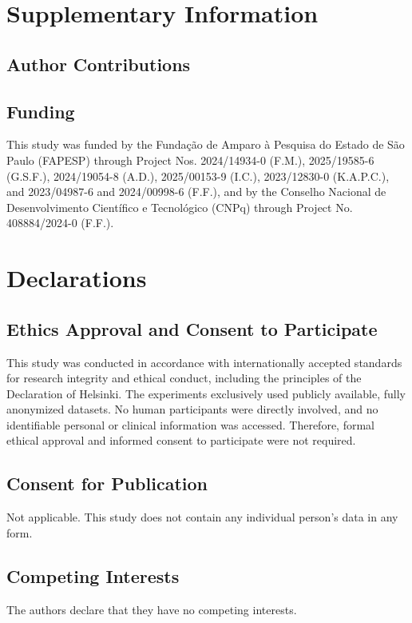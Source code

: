 \documentclass[pdflatex,bst/sn-mathphys-num]{sn-jnl}
\begin{document}
\section*{Supplementary Information}

\subsection*{Author Contributions}


\subsection*{Funding}
This study was funded by the Fundação de Amparo à Pesquisa do Estado de São Paulo (FAPESP) through Project Nos. 2024/14934-0 (F.M.), 2025/19585-6 (G.S.F.), 2024/19054-8 (A.D.), 2025/00153-9 (I.C.), 2023/12830-0 (K.A.P.C.), and 2023/04987-6 and 2024/00998-6 (F.F.), and by the Conselho Nacional de Desenvolvimento Científico e Tecnológico (CNPq) through Project No. 408884/2024-0 (F.F.).

\section*{Declarations}

\subsection*{Ethics Approval and Consent to Participate}
This study was conducted in accordance with internationally accepted standards for research integrity and ethical conduct, including the principles of the Declaration of Helsinki. The experiments exclusively used publicly available, fully anonymized datasets. No human participants were directly involved, and no identifiable personal or clinical information was accessed. Therefore, formal ethical approval and informed consent to participate were not required.

\subsection*{Consent for Publication}
Not applicable. This study does not contain any individual person’s data in any form.

\subsection*{Competing Interests}
The authors declare that they have no competing interests.




\end{document}
